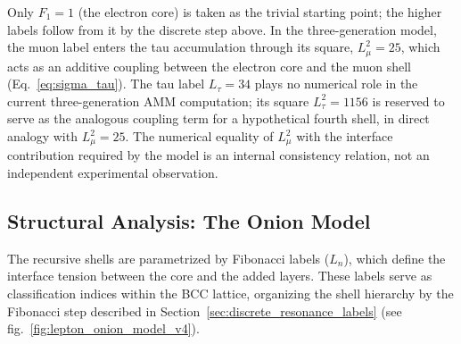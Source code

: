 \documentclass[10pt,a4paper]{article}
\begin{document}
\smallskip
\noindent
Only $F_1 = 1$ (the electron core) is taken as the trivial starting
point; the higher labels follow from it by the discrete step above. In
the three-generation model, the muon label enters the tau accumulation
through its square, $L_\mu^2 = 25$, which acts as an additive coupling
between the electron core and the muon shell (Eq.~\eqref{eq:sigma_tau}).
The tau label $L_\tau = 34$ plays no numerical role in the current
three-generation AMM computation; its square $L_\tau^2 = 1156$ is
reserved to serve as the analogous coupling term for a hypothetical
fourth shell, in direct analogy with $L_\mu^2 = 25$. The numerical
equality of $L_\mu^2$ with the interface contribution required by the
model is an internal consistency relation, not an independent
experimental observation.

\subsection{Structural Analysis: The Onion Model}
\label{sec:onion_analysis}

The recursive shells are parametrized by Fibonacci labels ($L_n$), which define the interface tension between the core and the added layers. These labels serve as classification indices within the BCC lattice, organizing the shell hierarchy by the Fibonacci step described in Section~\ref{sec:discrete_resonance_labels} (see fig.~\ref{fig:lepton_onion_model_v4}).
\end{document}

